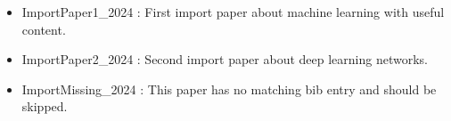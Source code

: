 

\begin{itemize}
  \item ImportPaper1\_2024 \cite{ImportPaper1_2024}: First import paper about machine learning with useful content.
  \item ImportPaper2\_2024 \cite{ImportPaper2_2024}: Second import paper about deep learning networks.
  \item ImportMissing\_2024 \cite{ImportMissing_2024}: This paper has no matching bib entry and should be skipped.
\end{itemize}

